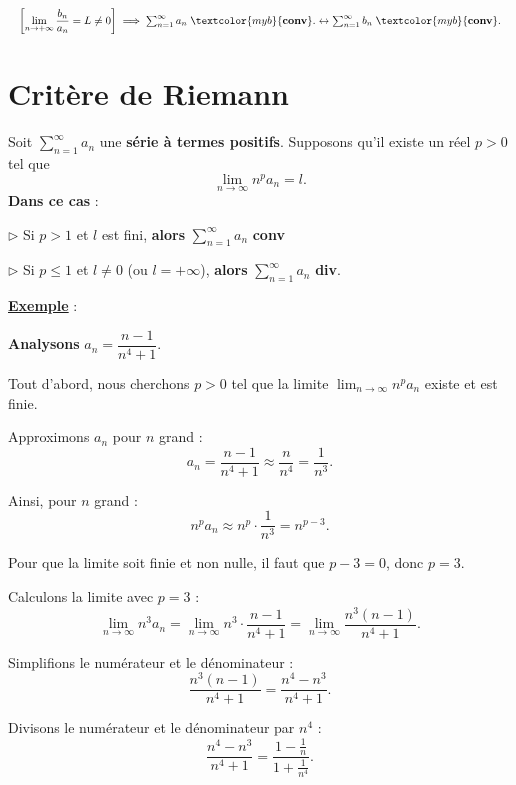 \documentclass{report}
\begin{document}
\begin{multicols*}{3}
        \begin{align*}
        \resizebox{1\linewidth}{!}{$
        \left[\lim\limits_{n \to+\infty } \dfrac{b_n}{a_n}  = L \neq 0 \right]
            \implies  \sum_{n=1}^{\infty }a_n \; \textcolor{myb}{\textbf{conv}}.  
        \leftrightarrow 
        \sum_{n=1}^{\infty }b_n \; \textcolor{myb}{\textbf{conv}}.                
        $}  
        \end{align*}
    \vspace{-1em}
    \section{Critère de Riemann}
    Soit $\sum_{n=1}^{\infty} a_n$ une \textbf{série à termes positifs}. Supposons 
    qu'il existe un réel $p > 0$ tel que 
    \[
    \lim_{n \to \infty} n^p a_n = l.
    \]
    \textbf{Dans ce cas } :

    \noindent
      $\rhd$ Si $p > 1$ et $l$ est fini, \textbf{alors} $\sum_{n=1}^{\infty} a_n$ 
    \textcolor{myb}{\textbf{conv}} 

    \vspace{0.75em}
    \noindent
      $\rhd$ Si $p \leq 1$ et $l \neq 0$ (ou $l = +\infty$), \textbf{alors }   
      $\sum_{n=1}^{\infty} a_n$ \textcolor{myr}{\textbf{div}}.
 

    \vspace{1em}
    \noindent
    \underline{\textbf{Exemple}} :

    \textbf{Analysons}  $a_n = \dfrac{n-1}{n^4+1}$. 

    \vspace{1em}
Tout d'abord, nous cherchons $p > 0$ tel que la limite
$\lim_{n \to \infty} n^p a_n$ existe et est finie.

Approximons $a_n$ pour $n$ grand :
\[
a_n = \frac{n - 1}{n^4 + 1} \approx \frac{n}{n^4} = \frac{1}{n^3}.
\]

Ainsi, pour $n$ grand :
\[
n^p a_n \approx n^p \cdot \frac{1}{n^3} = n^{p - 3}.
\]

Pour que la limite soit finie et non nulle, il faut que $p - 3 = 0$, donc $p = 3$.


Calculons la limite avec $p = 3$ :
\[
\lim_{n \to \infty} n^3 a_n = \lim_{n \to \infty}
n^3 \cdot \frac{n - 1}{n^4 + 1} = \lim_{n \to \infty}
\frac{n^3 (n - 1)}{n^4 + 1}.
\]

Simplifions le numérateur et le dénominateur :
\[
\frac{n^3 (n - 1)}{n^4 + 1} = \frac{n^4 - n^3}{n^4 + 1}.
\]

Divisons le numérateur et le dénominateur par $n^4$ :
\[
\frac{n^4 - n^3}{n^4 + 1} = \frac{1 - \frac{1}{n}}{1 + \frac{1}{n^4}}.
\]


\end{multicols*}
\end{document}
